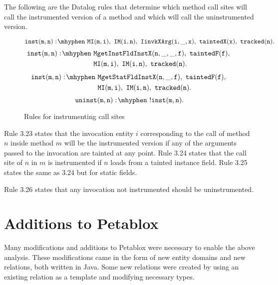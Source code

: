 The following are the Datalog rules that determine which method call
sites will call the instrumented version of a method and which will
call the uninstrumented version.

\begin{figure}[H]
\begin{equation}
  \mathtt{inst(m,n) \is MI(m,i) \also IM(i,n) \also IinvkXArg(i,\_,x)
    \also taintedX(x) \also tracked(n).}
\end{equation}
\begin{equation}
  \begin{split}
    \mathtt{inst(m,n) \is} & \mathtt{MgetInstFldInstX(n,\_,\_,f) \also
      taintedF(f) \also} \\ & \mathtt{MI(m,i) \also IM(i,n) \also
      tracked(n).}
  \end{split}
\end{equation}
\begin{equation}
  \begin{split}
    \mathtt{inst(m,n) \is} & \mathtt{MgetStatFldInstX(n,\_,f) \also
      taintedF(f) \also} \\ & \mathtt{MI(m,i) \also IM(i,n) \also
      tracked(n).}
  \end{split}
\end{equation}
\begin{equation}
  \mathtt{uninst(m,n) \is !inst(m,n).}
\end{equation}
\caption{Rules for instrumenting call sites}\label{fig:inst}
\end{figure}

Rule 3.23 states that the invocation entity $i$ corresponding to the
call of method $n$ inside method $m$ will be the instrumented version
if any of the arguments passed to the invocation are tainted at any
point. Rule 3.24 states that the call site of $n$ in $m$ is
instrumented if $n$ loads from a tainted instance field. Rule 3.25
states the same as 3.24 but for static fields.

Rule 3.26 states that any invocation not instrumented should be
uninstrumented.

\section{Additions to Petablox}
Many modifications and additions to Petablox were necessary to enable
the above analysis. These modifications came in the form of new entity
domains and new relations, both written in Java. Some new relations
were created by using an existing relation as a template and modifying
necessary types.

